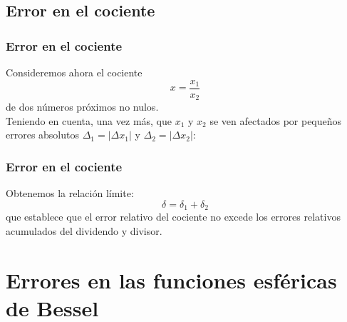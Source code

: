 \subsection{Error en el cociente}
\begin{frame}
\frametitle{Error en el cociente}
Consideremos ahora el cociente
\[ x = \dfrac{x_{1}}{x_{2}} \]
de dos números próximos no nulos.
\\
\bigskip
\pause
Teniendo en cuenta, una vez más, que $x_{1}$ y $x_{2}$ se ven afectados por pequeños errores absolutos $\Delta_{1} = \vert \Delta x_{1} \vert$ y $\Delta_{2} = \vert \Delta x_{2} \vert$:
\end{frame}
\begin{frame}
\frametitle{Error en el cociente}
Obtenemos la relación límite:
\begin{equation}
\delta = \delta_{1} + \delta_{2}
\label{eq:ecuacion_01_27}
\end{equation}
que establece que el error relativo del cociente no excede los errores relativos acumulados del dividendo y divisor.
\end{frame}
\section{Errores en las funciones esféricas de Bessel}
